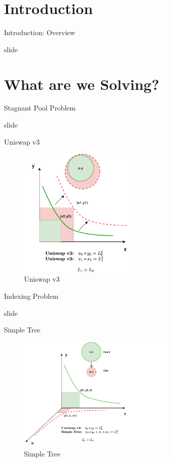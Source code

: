 \documentclass[10pt,xcolor=svgnames]{beamer} %
\begin{document}
\section{Introduction}

\begin{frame}{Introduction: Overview} %

slide

\end{frame}


\section{What are we Solving?}

\begin{frame}{Stagnant Pool Problem} 

slide

\end{frame}


\begin{frame}{Uniswap v3} 

\begin{figure}[h!]
\includegraphics[width=2.3in]{img/uniswap_v3.png}
\caption{Uniswap v3} 
\label{fig:uniswap_v3}
\end{figure}

\end{frame}

\begin{frame}{Indexing Problem} 

slide

\end{frame}


\begin{frame}{Simple Tree} 

\begin{figure}[h!]
\includegraphics[width=3in]{img/simple_tree.png}
\caption{Simple Tree} 
\label{fig:simple_tree}
\end{figure}

\end{frame}
\end{document}
